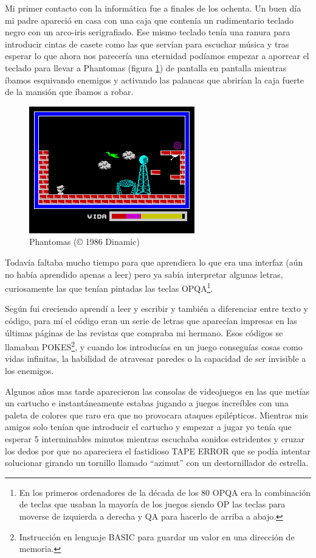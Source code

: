 Mi primer contacto con la informática fue a finales de los ochenta. Un buen día mi padre apareció en casa con una caja que contenía un rudimentario teclado negro con un arco-iris serigrafiado. Ese mismo teclado tenía una ranura para introducir cintas de casete como las que servían para escuchar música y tras esperar lo que ahora nos parecería una eternidad podíamos empezar a aporrear el teclado para llevar a Phantomas (figura \ref{fig:phantomas}) de pantalla en pantalla mientras íbamos esquivando enemigos y activando las palancas que abrirían la caja fuerte de la mansión que íbamos a robar.


\begin{figure}[h!]
\centering
\includegraphics{../images/phantomas-sp1}
\caption{Phantomas (© 1986 Dinamic)}
\label{fig:phantomas}
\end{figure}

\bigskip
Todavía faltaba mucho tiempo para que aprendiera lo que era una interfaz (aún no había aprendido apenas a leer) pero ya sabía interpretar algunas letras, curiosamente las que tenían pintadas las teclas OPQA\footnote{En los primeros ordenadores de la década de los 80 OPQA era la combinación de teclas que usaban la mayoría de los juegos siendo OP las teclas para moverse de izquierda a derecha y QA para hacerlo de arriba a abajo.}.

\bigskip
Según fui creciendo aprendí a leer y escribir y también a diferenciar entre texto y código, para mí el código eran un serie de letras que aparecían impresas en las últimas páginas de las revistas que compraba mi hermano. Esos códigos se llamaban POKES\footnote{Instrucción en lenguaje BASIC para guardar un valor en una dirección de memoria.}, y cuando los introducías en un juego conseguías cosas como vidas infinitas, la habilidad de atravesar paredes o la capacidad de ser invisible a los enemigos.

\bigskip
Algunos años mas tarde aparecieron las consolas de videojuegos en las que metías un cartucho e instantáneamente estabas jugando a juegos increíbles con una paleta de colores que raro era que no provocara ataques epilépticos. Mientras mis amigos solo tenían que introducir el cartucho y empezar a jugar yo tenía que esperar 5 interminables minutos mientras escuchaba sonidos estridentes y cruzar los dedos por que no apareciera el fastidioso TAPE ERROR que se podía intentar solucionar girando un tornillo llamado ``azimut'' con un destornillador de estrella.

